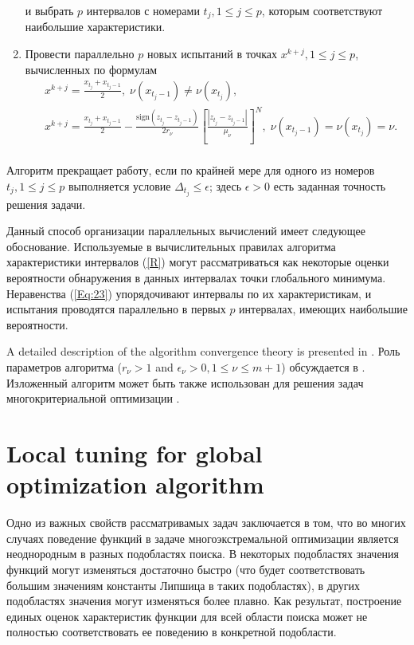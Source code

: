 \documentclass[
11pt,%
tightenlines,%
twoside,%
onecolumn,%
nofloats,%
nobibnotes,%
nofootinbib,%
superscriptaddress,%
noshowpacs,%
centertags]%
{revtex4}
\begin{document}
\begin{enumerate}
\begin{equation}
\end{equation}
и выбрать $p$ интервалов с номерами $t_j, 1\leq j \leq p$, которым соответствуют наибольшие характеристики.
\item
Провести параллельно $p$ новых испытаний в точках $x^{k+j}, 1 \leq j \leq p$, вычисленных по формулам
\begin{eqnarray*}
& x^{k+j}=\frac{x_{t_j}+x_{t_j-1}}{2}, \; \nu(x_{t_j-1})\neq \nu(x_{t_j}), \\
& x^{k+j}=\frac{x_{t_j}+x_{t_j-1}}{2}- \frac{\mathrm{sign}(z_{t_j}-z_{t_j-1})}{2r_\nu}\left[\frac{\left|z_{t_j}-z_{t_j-1}\right|}{\mu_\nu}\right]^N, \; \nu(x_{t_j-1})=\nu(x_{t_j})=\nu. \\
\end{eqnarray*} 

\end{enumerate}

Алгоритм прекращает работу, если по крайней мере для одного из номеров $t_j, 1\leq j \leq p$ выполняется условие $\Delta_{t_j}\leq \epsilon$; здесь $\epsilon>0$ есть заданная точность решения задачи.

Данный способ организации параллельных вычислений имеет следующее обоснование. Используемые в вычислительных правилах алгоритма характеристики интервалов (\ref{R}) могут рассматриваться как некоторые оценки вероятности обнаружения в данных интервалах точки глобального минимума. Неравенства (\ref{Eq:23}) упорядочивают интервалы по их характеристикам, и испытания проводятся параллельно в первых $p$ интервалах, имеющих наибольшие вероятности.

A detailed description of the algorithm convergence theory is presented in \cite{Strongin2000,Strongin2013}.
Роль параметров алгоритма ($r_\nu>1$ and $\epsilon_\nu>0, 1\leq\nu\leq m+1$) обсуждается в \cite{Strongin2020}.
Изложенный алгоритм может быть также использован для решения задач многокритериальной оптимизации \cite{Gergel2020}.



\section{Local tuning for global optimization algorithm}

Одно из важных свойств рассматривамых задач заключается в том, что во многих случаях поведение функций в задаче многоэкстремальной оптимизации является неоднородным в разных подобластях поиска. В некоторых подобластях значения функций могут изменяться достаточно быстро (что будет соответствовать большим значениям константы Липшица в таких подобластях), в других подобластях значения могут изменяться более плавно. Как результат, построение единых оценок характеристик функции для всей области поиска может не полностью соответствовать ее поведению в конкретной подобласти. 
\end{document}
